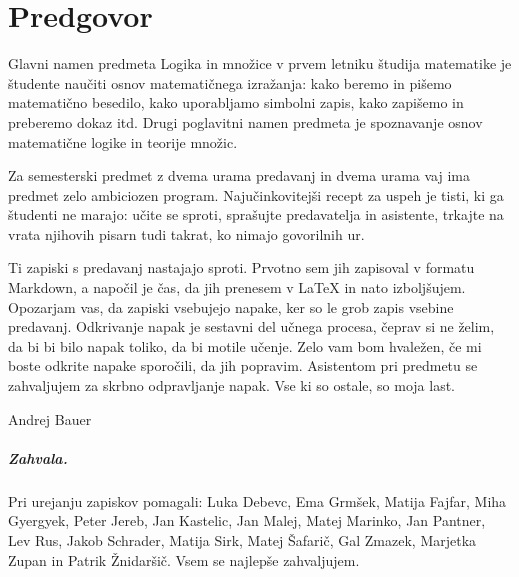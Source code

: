 \chapter*{Predgovor}
\label{chap:predgovor}

Glavni namen predmeta Logika in množice v prvem letniku študija matematike je študente
naučiti osnov matematičnega izražanja: kako beremo in pišemo matematično besedilo, kako
uporabljamo simbolni zapis, kako zapišemo in preberemo dokaz itd. Drugi poglavitni namen
predmeta je spoznavanje osnov matematične logike in teorije množic.

Za semesterski predmet z dvema urama predavanj in dvema urama vaj ima predmet zelo
ambiciozen program. Najučinkovitejši recept za uspeh je tisti, ki ga študenti ne marajo:
učite se sproti, sprašujte predavatelja in asistente, trkajte na vrata njihovih pisarn
tudi takrat, ko nimajo govorilnih ur.

Ti zapiski s predavanj nastajajo sproti. Prvotno sem jih zapisoval v formatu Markdown, a napočil je čas, da jih prenesem v {\LaTeX} in nato izboljšujem. Opozarjam vas, da zapiski vsebujejo napake, ker so le grob zapis vsebine predavanj. Odkrivanje napak je sestavni del učnega procesa, čeprav si ne želim, da bi bi bilo napak toliko, da bi motile učenje. Zelo vam bom hvaležen, če mi boste odkrite napake sporočili, da jih popravim. Asistentom pri predmetu se zahvaljujem za skrbno odpravljanje napak. Vse ki so ostale, so moja last.

\bigskip

\begin{flushright}
Andrej Bauer \qquad\hbox{}
\end{flushright}

\bigskip

\paragraph{Zahvala.}
%
Pri urejanju zapiskov pomagali:
%
Luka Debevc,
Ema Grmšek,
Matija Fajfar,
Miha Gyergyek,
Peter Jereb,
Jan Kastelic,
Jan Malej,
Matej Marinko,
Jan Pantner,
Lev Rus,
Jakob Schrader,
Matija Sirk,
Matej Šafarič,
Gal Zmazek,
Marjetka Zupan in Patrik Žnidaršič.
%
Vsem se najlepše zahvaljujem.


